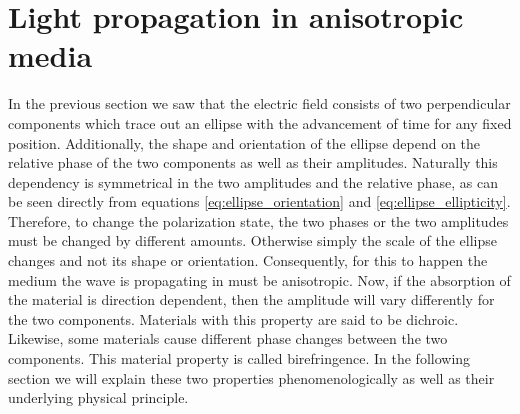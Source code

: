 \section{Light propagation in anisotropic media}
\label{sec:wave_prop}
In the previous section we saw that the electric field consists of two perpendicular components which trace out an ellipse with the advancement of time for any fixed position. Additionally, the shape and orientation of the ellipse depend on the relative phase of the two components as well as their amplitudes. Naturally this dependency is symmetrical in the two amplitudes and the relative phase, as can be seen directly from equations \ref{eq:ellipse_orientation} and \ref{eq:ellipse_ellipticity}. Therefore, to change the polarization state, the two phases or the two amplitudes must be changed by different amounts. Otherwise simply the scale of the ellipse changes and not its shape or orientation. Consequently, for this to happen the medium the wave is propagating in must be anisotropic. Now, if the absorption of the material is direction dependent, then the amplitude will vary differently for the two components. Materials with this property are said to be dichroic. Likewise, some materials cause different phase changes between the two components. This material property is called birefringence. In the following section we will explain these two properties phenomenologically as well as their underlying physical principle.

